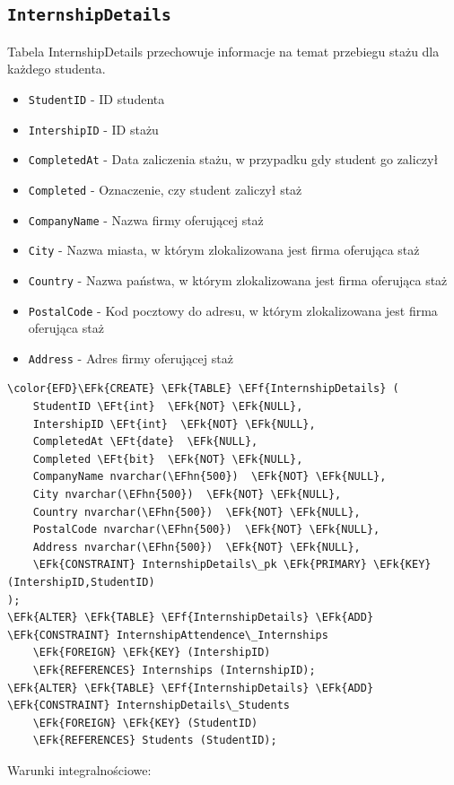 \documentclass[11pt]{article}
\newcommand{\EFk}[1]{\textcolor{EFk}{\textbf{#1}}} %
\newcommand{\EFf}[1]{\textcolor{EFf}{#1}} %
\newcommand{\EFt}[1]{\textcolor{EFt}{\textbf{#1}}} %
\newcommand{\EFhn}[1]{\textcolor{EFhn}{#1}} %
\begin{document}
\subsection{\texttt{InternshipDetails}}
\label{sec:org2364cc0}
Tabela InternshipDetails przechowuje informacje na temat przebiegu stażu dla każdego studenta.
\begin{itemize}
\item \texttt{StudentID} - ID studenta
\item \texttt{IntershipID} - ID stażu
\item \texttt{CompletedAt} - Data zaliczenia stażu, w przypadku gdy student go zaliczył
\item \texttt{Completed} - Oznaczenie, czy student zaliczył staż
\item \texttt{CompanyName} - Nazwa firmy oferującej staż
\item \texttt{City} - Nazwa miasta, w którym zlokalizowana jest firma oferująca staż
\item \texttt{Country} - Nazwa państwa, w którym zlokalizowana jest firma oferująca staż
\item \texttt{PostalCode} - Kod pocztowy do adresu, w którym zlokalizowana jest firma oferująca staż
\item \texttt{Address} - Adres firmy oferującej staż
\end{itemize}
\begin{Code}
\begin{Verbatim}
\color{EFD}\EFk{CREATE} \EFk{TABLE} \EFf{InternshipDetails} (
    StudentID \EFt{int}  \EFk{NOT} \EFk{NULL},
    IntershipID \EFt{int}  \EFk{NOT} \EFk{NULL},
    CompletedAt \EFt{date}  \EFk{NULL},
    Completed \EFt{bit}  \EFk{NOT} \EFk{NULL},
    CompanyName nvarchar(\EFhn{500})  \EFk{NOT} \EFk{NULL},
    City nvarchar(\EFhn{500})  \EFk{NOT} \EFk{NULL},
    Country nvarchar(\EFhn{500})  \EFk{NOT} \EFk{NULL},
    PostalCode nvarchar(\EFhn{500})  \EFk{NOT} \EFk{NULL},
    Address nvarchar(\EFhn{500})  \EFk{NOT} \EFk{NULL},
    \EFk{CONSTRAINT} InternshipDetails\_pk \EFk{PRIMARY} \EFk{KEY}  (IntershipID,StudentID)
);
\EFk{ALTER} \EFk{TABLE} \EFf{InternshipDetails} \EFk{ADD} \EFk{CONSTRAINT} InternshipAttendence\_Internships
    \EFk{FOREIGN} \EFk{KEY} (IntershipID)
    \EFk{REFERENCES} Internships (InternshipID);
\EFk{ALTER} \EFk{TABLE} \EFf{InternshipDetails} \EFk{ADD} \EFk{CONSTRAINT} InternshipDetails\_Students
    \EFk{FOREIGN} \EFk{KEY} (StudentID)
    \EFk{REFERENCES} Students (StudentID);
\end{Verbatim}
\end{Code}
Warunki integralnościowe:
\end{document}
